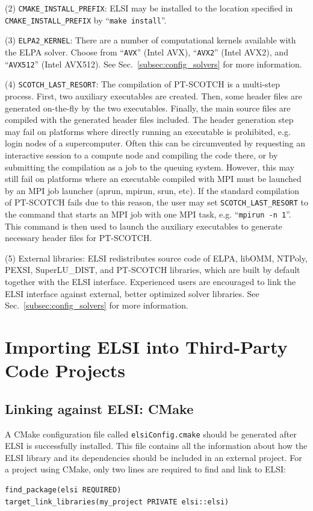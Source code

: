 \documentclass{report}
\begin{document}
(2) \texttt{CMAKE\_INSTALL\_PREFIX}: ELSI may be installed to the location specified in \texttt{CMAKE\_INSTALL\_PREFIX} by ``\texttt{make install}''.

(3) \texttt{ELPA2\_KERNEL}: There are a number of computational kernels available with the ELPA solver. Choose from ``\texttt{AVX}'' (Intel AVX), ``\texttt{AVX2}'' (Intel AVX2), and ``\texttt{AVX512}'' (Intel AVX512). See Sec.~\ref{subsec:config_solvers} for more information.

(4) \texttt{SCOTCH\_LAST\_RESORT}: The compilation of PT-SCOTCH is a multi-step process. First, two auxiliary executables are created. Then, some header files are generated on-the-fly by the two executables. Finally, the main source files are compiled with the generated header files included. The header generation step may fail on platforms where directly running an executable is prohibited, e.g. login nodes of a supercomputer. Often this can be circumvented by requesting an interactive session to a compute node and compiling the code there, or by submitting the compilation as a job to the queuing system. However, this may still fail on platforms where an executable compiled with MPI must be launched by an MPI job launcher (aprun, mpirun, srun, etc). If the standard compilation of PT-SCOTCH fails due to this reason, the user may set \texttt{SCOTCH\_LAST\_RESORT} to the command that starts an MPI job with one MPI task, e.g. ``\texttt{mpirun -n 1}''. This command is then used to launch the auxiliary executables to generate necessary header files for PT-SCOTCH.

(5) External libraries: ELSI redistributes source code of ELPA, libOMM, NTPoly, PEXSI, SuperLU\_DIST, and PT-SCOTCH libraries, which are built by default together with the ELSI interface. Experienced users are encouraged to link the ELSI interface against external, better optimized solver libraries. See Sec.~\ref{subsec:config_solvers} for more information.

\section{Importing ELSI into Third-Party Code Projects}
\label{sec:import}
\subsection{Linking against ELSI: CMake}
\label{subsec:import_cmake}
A CMake configuration file called \texttt{elsiConfig.cmake} should be generated after ELSI is successfully installed. This file contains all the information about how the ELSI library and its dependencies should be included in an external project. For a project using CMake, only two lines are required to find and link to ELSI:
\begin{tcolorbox}
\begin{verbatim}
find_package(elsi REQUIRED)
target_link_libraries(my_project PRIVATE elsi::elsi)
\end{verbatim}
\end{tcolorbox}
\end{document}
